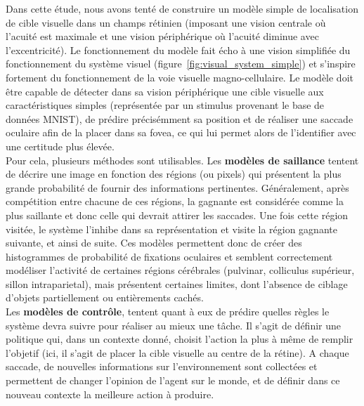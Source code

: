 Dans cette étude, nous avons tenté de construire un modèle simple de localisation de cible visuelle dans un champs rétinien (imposant une vision centrale où l'acuité est maximale et une vision périphérique où l'acuité diminue avec l'excentricité). Le fonctionnement du modèle fait écho à une vision simplifiée du fonctionnement du système visuel (figure~\ref{fig:visual_system_simple}) et s'inspire fortement du fonctionnement de la voie visuelle magno-cellulaire.
Le modèle doit être capable de détecter dans sa vision périphérique une cible visuelle aux caractéristiques simples (représentée par un stimulus provenant le base de données MNIST), de prédire précisémment sa position et de réaliser une saccade oculaire afin de la placer dans sa fovea, ce qui lui permet alors de l'identifier avec une certitude plus élevée.\autocite{Zhaoping2014} \\
Pour cela, plusieurs méthodes sont utilisables.
Les \textbf{modèles de saillance} tentent de décrire une image en fonction des régions (ou pixels) qui présentent la plus grande probabilité de fournir des informations pertinentes. Généralement, après compétition entre chacune de ces régions, la gagnante est considérée comme la plus saillante et donc celle qui devrait attirer les saccades. Une fois cette région visitée, le système l'inhibe dans sa représentation et visite la région gagnante suivante, et ainsi de suite. Ces modèles permettent donc de créer des histogrammes de probabilité de fixations oculaires et semblent correctement modéliser l'activité de certaines régions cérébrales (pulvinar, colliculus supérieur, sillon intraparietal), mais présentent certaines limites, dont l'absence de ciblage d'objets partiellement ou entièrements cachés\autocite{Butko2010, Itti2000}.\\
Les \textbf{modèles de contrôle}, tentent quant à eux de prédire quelles règles le système devra suivre pour réaliser au mieux une tâche. Il s'agit de définir une politique qui, dans un contexte donné, choisit l'action la plus à même de remplir l'objetif (ici, il s'agit de placer la cible visuelle au centre de la rétine).
A chaque saccade, de nouvelles informations sur l'environnement sont collectées et permettent de changer l'opinion de l'agent sur le monde, et de définir dans ce nouveau contexte la meilleure action à produire\autocite{Butko2010}.\\
